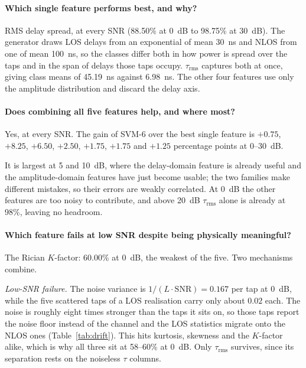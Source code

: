 \documentclass[11pt,a4paper]{article}
\begin{document}
\paragraph{Which single feature performs best, and why?}
RMS delay spread, at every SNR (88.50\% at 0~dB to 98.75\% at 30~dB). The generator draws LOS
delays from an exponential of mean 30~ns and NLOS from one of mean 100~ns, so the classes
differ both in how power is spread over the taps and in the span of delays those taps occupy.
$\tau_{\mathrm{rms}}$ captures both at once, giving class means of 45.19~ns against 6.98~ns.
The other four features use only the amplitude distribution and discard the delay axis.

\paragraph{Does combining all five features help, and where most?}
Yes, at every SNR. The gain of SVM-6 over the best single feature is $+0.75$, $+8.25$,
$+6.50$, $+2.50$, $+1.75$, $+1.75$ and $+1.25$ percentage points at 0--30~dB.

It is largest at 5 and 10~dB, where the delay-domain feature is already useful and the
amplitude-domain features have just become usable; the two families make different mistakes,
so their errors are weakly correlated. At 0~dB the other features are too noisy to contribute,
and above 20~dB $\tau_{\mathrm{rms}}$ alone is already at 98\%, leaving no headroom.

\paragraph{Which feature fails at low SNR despite being physically meaningful?}
\label{sec:kdiscussion}
The Rician $K$-factor: 60.00\% at 0~dB, the weakest of the five. Two mechanisms combine.

\emph{Low-SNR failure.} The noise variance is $1/(L\cdot\mathrm{SNR}) = 0.167$ per tap at
0~dB, while the five scattered taps of a LOS realisation carry only about $0.02$ each. The
noise is roughly eight times stronger than the taps it sits on, so those taps report the noise
floor instead of the channel and the LOS statistics migrate onto the NLOS ones
(Table~\ref{tab:drift}). This hits kurtosis, skewness and the $K$-factor alike, which is why
all three sit at 58--60\% at 0~dB. Only $\tau_{\mathrm{rms}}$ survives, since its separation
rests on the noiseless $\tau$ columns.
\end{document}
